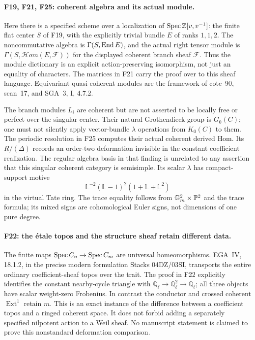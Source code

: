 \documentclass[11pt,a4paper]{article}
\newcommand{\Q}{\mathbb Q}\newcommand{\Z}{\mathbb Z}\newcommand{\C}{\mathbb C}\newcommand{\N}{\mathbb N}\newcommand{\F}{\mathbb F}
\newcommand{\fid}[1]{\textsf{#1}}\newcommand{\gate}[1]{\textsf{#1}}
\theoremstyle{named}\newtheorem{finding}{Finding}[section]
\theoremstyle{definition}\newtheorem{definition}[finding]{Definition}
\theoremstyle{remark}\newtheorem{remark}[finding]{Remark}
\begin{document}
\paragraph{\fid{F19}, \fid{F21}, \fid{F25}: coherent algebra and its actual module.}
Here there is a specified scheme over a localization of
$\Spec\Z[v,v^{-1}]$: the finite flat center $S$ of \fid{F19}, with
the explicitly trivial bundle $E$ of ranks $1,1,2$.
The noncommutative algebra is $\Gamma(S,\operatorname{End} E)$, and the actual
right tensor module is $\Gamma(S,\mathcal Hom(E,\mathcal F))$ for
the displayed coherent branch sheaf $\mathcal F$. Thus the module
dictionary is an explicit action-preserving isomorphism, not just
an equality of characters. The matrices in \fid{F21} carry the proof
over to this sheaf language. Equivariant quasi-coherent modules are
the framework of cote~90, scan~17, and SGA~3, I, 4.7.2.

The branch modules $L_i$ are coherent but are not asserted to be
locally free or perfect over the singular center. Their natural
Grothendieck group is $G_0(C)$; one must not silently apply vector-bundle
$\lambda$ operations from $K_0(C)$ to them. The periodic resolution
in \fid{F25} computes their actual coherent derived Hom. Its
$R/(\Delta)$ records an order-two deformation invisible in the
constant coefficient realization. The regular algebra basis in that
finding is unrelated to any assertion that this singular coherent
category is semisimple. Its scalar $\lambda$ has compact-support motive
\[
 \mathbb L^{-2}(\mathbb L-1)^2(1+\mathbb L+\mathbb L^2)
\]
in the virtual Tate ring. The trace equality follows from
$\mathbb G_m^2\times\mathbb P^2$ and the trace formula; its mixed signs are
cohomological Euler signs, not dimensions of one pure degree.

\paragraph{\fid{F22}: the \'etale topos and the structure sheaf retain different data.}
The finite maps $\operatorname{Spec} C_n\to\operatorname{Spec} C_m$ are universal
homeomorphisms. EGA~IV, 18.1.2, in the precise modern formulation
Stacks 04DZ/03SI, transports the entire ordinary coefficient-sheaf
topos over the trait. The proof in \fid{F22} explicitly identifies
the constant nearby-cycle triangle with
$\Q_\ell\to\Q_\ell^2\to\Q_\ell$; all three objects have scalar
weight-zero Frobenius. In contrast the conductor and crossed coherent
$\operatorname{Ext}^1$ retain $m$. This is an exact instance of the
difference between a coefficient topos and a ringed coherent space.
It does not forbid adding a separately specified nilpotent action to
a Weil sheaf. No manuscript statement is claimed to prove this
nonstandard deformation comparison.
\end{document}
